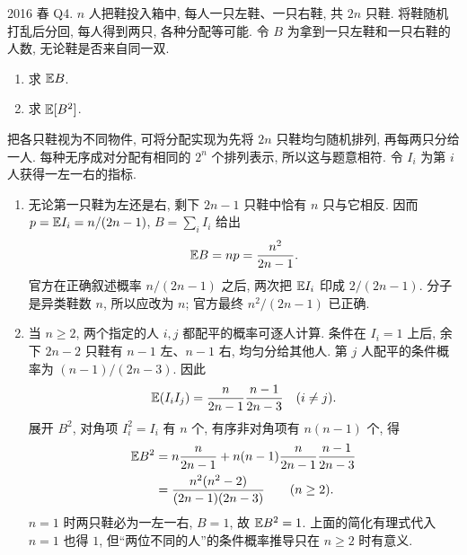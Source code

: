\begin{exercise}\label{ex:fe2016q4}
2016 春 Q4. $n$ 人把鞋投入箱中, 每人一只左鞋、一只右鞋, 共 $2n$ 只鞋. 将鞋随机打乱后分回, 每人得到两只, 各种分配等可能. 令 $B$ 为拿到一只左鞋和一只右鞋的人数, 无论鞋是否来自同一双.
\begin{enumerate}[label=(\alph*)]
\item\label{ex:fe2016q4-a} 求 $\mathbb E B$.
\item\label{ex:fe2016q4-b} 求 $\mathbb E[B^2]$.
\end{enumerate}
\end{exercise}
\begin{solution}
把各只鞋视为不同物件, 可将分配实现为先将 $2n$ 只鞋均匀随机排列, 再每两只分给一人. 每种无序成对分配有相同的 $2^n$ 个排列表示, 所以这与题意相符. 令 $I_i$ 为第 $i$ 人获得一左一右的指标.
\begin{enumerate}[label=(\alph*)]
\item\label{sol:fe2016q4-a} 无论第一只鞋为左还是右, 剩下 $2n-1$ 只鞋中恰有 $n$ 只与它相反. 因而 $p=\mathbb E I_i=n/(2n-1)$, $B=\sum_iI_i$ 给出
\[
 \mathbb E B=np=\frac{n^2}{2n-1}.
\]
官方在正确叙述概率 $n/(2n-1)$ 之后, 两次把 $\mathbb E I_i$ 印成 $2/(2n-1)$. 分子是异类鞋数 $n$, 所以应改为 $n$; 官方最终 $n^2/(2n-1)$ 已正确.
\item\label{sol:fe2016q4-b} 当 $n\ge2$, 两个指定的人 $i,j$ 都配平的概率可逐人计算. 条件在 $I_i=1$ 上后, 余下 $2n-2$ 只鞋有 $n-1$ 左、$n-1$ 右, 均匀分给其他人. 第 $j$ 人配平的条件概率为 $(n-1)/(2n-3)$. 因此
\[
 \mathbb E(I_iI_j)=\frac{n}{2n-1}\frac{n-1}{2n-3}\quad(i\ne j).
\]
展开 $B^2$, 对角项 $I_i^2=I_i$ 有 $n$ 个, 有序非对角项有 $n(n-1)$ 个, 得
\begin{align*}
 \mathbb E B^2&=n\frac{n}{2n-1}
 +n(n-1)\frac{n}{2n-1}\frac{n-1}{2n-3}\\
 &=\frac{n^2(n^2-2)}{(2n-1)(2n-3)}\qquad(n\ge2).
\end{align*}
$n=1$ 时两只鞋必为一左一右, $B=1$, 故 $\mathbb E B^2=1$. 上面的简化有理式代入 $n=1$ 也得 $1$, 但“两位不同的人”的条件概率推导只在 $n\ge2$ 时有意义.
\end{enumerate}
\end{solution}

